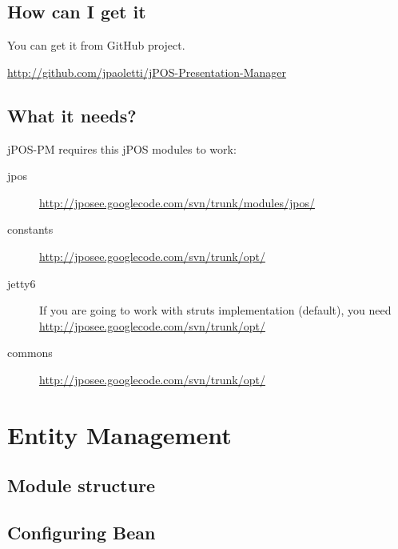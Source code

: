 \subsection{How can I get it}

You can get it from GitHub project.

\url{http://github.com/jpaoletti/jPOS-Presentation-Manager}

\subsection{What it needs?}

jPOS-PM requires this jPOS modules to work:

\begin{description}
\item[jpos] \url{http://jposee.googlecode.com/svn/trunk/modules/jpos/}
\item[constants] \url{http://jposee.googlecode.com/svn/trunk/opt/}
\item[jetty6] If you are going to work with struts implementation (default),
you need \url{http://jposee.googlecode.com/svn/trunk/opt/}
\item[commons] \url{http://jposee.googlecode.com/svn/trunk/opt/}
\end{description}

\section{Entity Management}

\subsection{Module structure}

\subsection{Configuring Bean}

